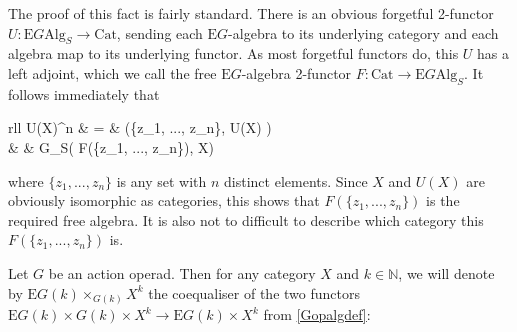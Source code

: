 The proof of this fact is fairly standard. There is an obvious forgetful 2-functor $U: \mathrm{E}G\mathrm{Alg}_S \to \mathrm{Cat}$, sending each $\mathrm{E}G$-algebra to its underlying category and each algebra map to its underlying functor. As most forgetful functors do, this $U$ has a left adjoint, which we call the free $\mathrm{E}G$-algebra 2-functor $F : \mathrm{Cat} \to \mathrm{E}G\mathrm{Alg}_S $. It follows immediately that
\begin{eq*}\begin{array}{rll}
		U(X)^n & = & (\{z_1, ..., z_n\}, U(X) ) \\
		& \cong & G_S( F(\{z_1, ..., z_n\}), X) 
		\end{array}
\end{eq*}
where $\{z_1, ..., z_n\}$ is any set with $n$ distinct elements. Since $X$ and $U(X)$ are obviously isomorphic as categories, this shows that $F(\{z_1, ..., z_n\})$ is the required free algebra. It is also not to difficult to describe which category this $F(\{z_1, ..., z_n\})$ is.

\begin{defn} Let $G$ be an action operad. Then for any category $X$ and $k \in \mathbb{N}$, we will denote by $\mathrm{E}G(k) \times_{G(k)} X^k$ the coequaliser of the two functors $\mathrm{E}G(k) \times G(k) \times X^k \to \mathrm{E}G(k) \times X^k$ from \cref{Gopalgdef}:
\begin{eq*}  \end{eq*}
\end{defn} 

